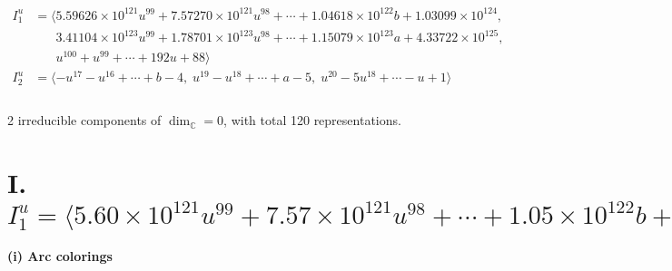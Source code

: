\documentclass[1p]{elsarticle_modified}
\theoremstyle{definition}
\begin{document}
\begin{align*}
I^u_{1}&=\langle 
5.59626\times10^{121} u^{99}+7.57270\times10^{121} u^{98}+\cdots+1.04618\times10^{122} b+1.03099\times10^{124},\\
\phantom{I^u_{1}}&\phantom{= \langle  }3.41104\times10^{123} u^{99}+1.78701\times10^{123} u^{98}+\cdots+1.15079\times10^{123} a+4.33722\times10^{125},\\
\phantom{I^u_{1}}&\phantom{= \langle  }u^{100}+u^{99}+\cdots+192 u+88\rangle \\
I^u_{2}&=\langle 
- u^{17}- u^{16}+\cdots+b-4,\;u^{19}- u^{18}+\cdots+a-5,\;u^{20}-5 u^{18}+\cdots- u+1\rangle \\
\\
\end{align*}
\raggedright * 2 irreducible components of $\dim_{\mathbb{C}}=0$, with total 120 representations.\\
\newpage
\renewcommand{\arraystretch}{1}
\centering \section*{I. $I^u_{1}= \langle 5.60\times10^{121} u^{99}+7.57\times10^{121} u^{98}+\cdots+1.05\times10^{122} b+1.03\times10^{124},\;3.41\times10^{123} u^{99}+1.79\times10^{123} u^{98}+\cdots+1.15\times10^{123} a+4.34\times10^{125},\;u^{100}+u^{99}+\cdots+192 u+88 \rangle$}
\flushleft \textbf{(i) Arc colorings}\\
\end{document}
